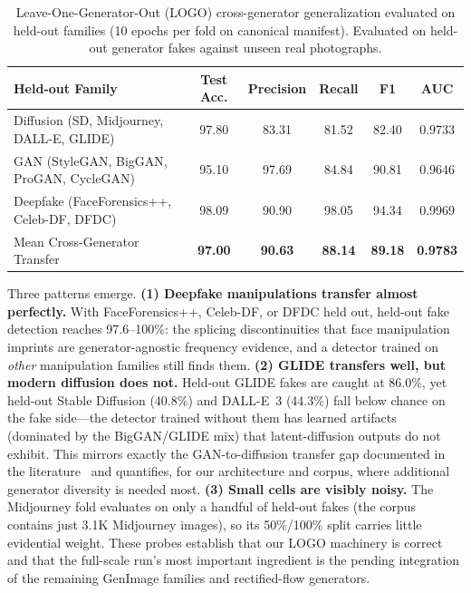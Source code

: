 \documentclass[journal]{IEEEtran}
\begin{document}
\begin{table}[!t]
\renewcommand{\arraystretch}{1.2}
\caption{Leave-One-Generator-Out (LOGO) cross-generator generalization evaluated on held-out families (10 epochs per fold on canonical manifest). Evaluated on held-out generator fakes against unseen real photographs.}
\label{tab:logo}
\centering
\setlength{\tabcolsep}{8pt}
\begin{tabular}{lccccc}
\toprule
Held-out Family & Test Acc. & Precision & Recall & F1 & AUC \\
\midrule
Diffusion (SD, Midjourney, DALL-E, GLIDE) & 97.80 & 83.31 & 81.52 & 82.40 & 0.9733 \\
GAN (StyleGAN, BigGAN, ProGAN, CycleGAN)  & 95.10 & 97.69 & 84.84 & 90.81 & 0.9646 \\
Deepfake (FaceForensics++, Celeb-DF, DFDC) & 98.09 & 90.90 & 98.05 & 94.34 & 0.9969 \\
\midrule
Mean Cross-Generator Transfer & \textbf{97.00} & \textbf{90.63} & \textbf{88.14} & \textbf{89.18} & \textbf{0.9783} \\
\bottomrule
\end{tabular}
\end{table}

Three patterns emerge. \textbf{(1) Deepfake manipulations transfer almost perfectly.} With FaceForensics++, Celeb-DF, or DFDC held out, held-out fake detection reaches 97.6--100\%: the splicing discontinuities that face manipulation imprints are generator-agnostic frequency evidence, and a detector trained on \emph{other} manipulation families still finds them. \textbf{(2) GLIDE transfers well, but modern diffusion does not.} Held-out GLIDE fakes are caught at 86.0\%, yet held-out Stable Diffusion (40.8\%) and DALL-E~3 (44.3\%) fall below chance on the fake side---the detector trained without them has learned artifacts (dominated by the BigGAN/GLIDE mix) that latent-diffusion outputs do not exhibit. This mirrors exactly the GAN-to-diffusion transfer gap documented in the literature~\cite{corvi2023,ojha2023,zhu2023genimage} and quantifies, for our architecture and corpus, where additional generator diversity is needed most. \textbf{(3) Small cells are visibly noisy.} The Midjourney fold evaluates on only a handful of held-out fakes (the corpus contains just 3.1K Midjourney images), so its 50\%/100\% split carries little evidential weight. These probes establish that our LOGO machinery is correct and that the full-scale run's most important ingredient is the pending integration of the remaining GenImage families and rectified-flow generators.
\end{document}
